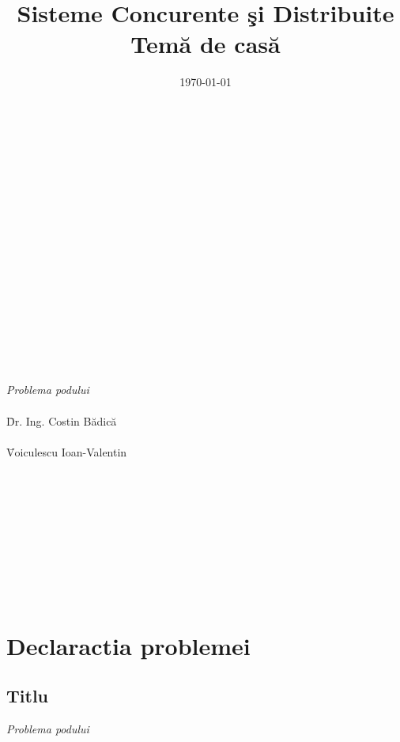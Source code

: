 \documentclass{article}
\begin{document}

	\title{\textbf{Sisteme Concurente \c{s}i Distribuite}\\Tem\u{a} de cas\u{a}}
	\date{\large \today} 
	\maketitle
	\begin{tabbing}
	\\ \\ \\ \\ \\ \\ \\ \\ \\ \\ \\ \\ \\ \\ \\ \\
	 \={\large \textit{Problema podului}}\\ \\
	 \={\large Dr. Ing. Costin B\u{a}dic\u{a}}\\ \\
     \={\large Voiculescu Ioan-Valentin}\\ \\
    \\ \\
    \\ \\
    \\ \\
    \\ \\
	\end{tabbing}
	\newpage
    \tableofcontents
    \newpage


\section{Declarac{t}ia problemei}
\subsection{Titlu}
\textit{Problema podului}
\end{document}
